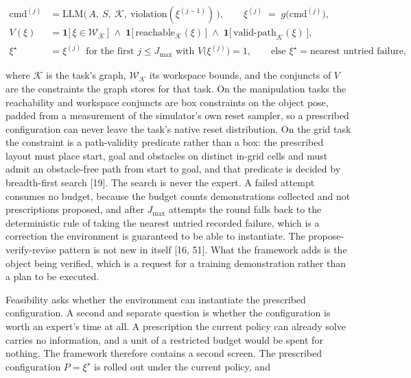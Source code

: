 \documentclass[
  11pt,
]{article}
\begin{document}
\[
\begin{aligned}
\mathrm{cmd}^{(j)} &= \mathrm{LLM}\big(\, A,\ S,\ \mathcal{K},\ \text{violation}(\xi^{(j-1)}) \,\big), \qquad \xi^{(j)} \;=\; g\big(\mathrm{cmd}^{(j)}\big), \\[2pt]
V(\xi) &= \mathbf{1}\big[\, \xi \in \mathcal{W}_{\mathcal{K}} \,\big] \;\wedge\; \mathbf{1}\big[\, \mathrm{reachable}_{\mathcal{K}}(\xi) \,\big] \;\wedge\; \mathbf{1}\big[\, \mathrm{valid\text{-}path}_{\mathcal{K}}(\xi) \,\big], \\[2pt]
\xi^\star &= \xi^{(j)} \ \ \text{for the first } j \le J_{\max} \text{ with } V\big(\xi^{(j)}\big) = 1, \qquad \text{else } \xi^\star = \text{nearest untried failure},
\end{aligned}
\tag{10}
\]

where \(\mathcal{K}\) is the task's graph, \(\mathcal{W}_{\mathcal{K}}\)
its workspace bounds, and the conjuncts of \(V\) are the constraints the
graph stores for that task. On the manipulation tasks the reachability
and workspace conjuncts are box constraints on the object pose, padded
from a measurement of the simulator's own reset sampler, so a prescribed
configuration can never leave the task's native reset distribution. On
the grid task the constraint is a path-validity predicate rather than a
box: the prescribed layout must place start, goal and obstacles on
distinct in-grid cells and must admit an obstacle-free path from start
to goal, and that predicate is decided by breadth-first search {[}19{]}.
The search is never the expert. A failed attempt consumes no budget,
because the budget counts demonstrations collected and not prescriptions
proposed, and after \(J_{\max}\) attempts the round falls back to the
deterministic rule of taking the nearest untried recorded failure, which
is a correction the environment is guaranteed to be able to instantiate.
The propose-verify-revise pattern is not new in itself {[}16, 51{]}.
What the framework adds is the object being verified, which is a request
for a training demonstration rather than a plan to be executed.

Feasibility asks whether the environment can instantiate the prescribed
configuration. A second and separate question is whether the
configuration is worth an expert's time at all. A prescription the
current policy can already solve carries no information, and a unit of a
restricted budget would be spent for nothing. The framework therefore
contains a second screen. The prescribed configuration \(P = \xi^\star\)
is rolled out under the current policy, and
\end{document}
